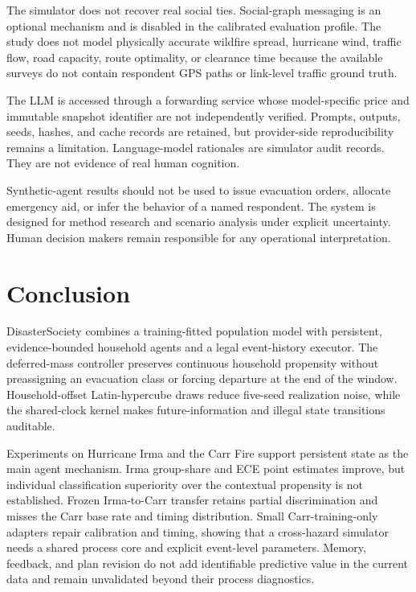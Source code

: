 \documentclass[journal]{IEEEtran}
\newcommand{\method}{DisasterSociety}
\begin{document}
The simulator does not recover real social ties. Social-graph messaging is an
optional mechanism and is disabled in the calibrated evaluation profile. The
study does not model physically accurate wildfire spread, hurricane wind,
traffic flow, road capacity, route optimality, or clearance time because the
available surveys do not contain respondent GPS paths or link-level traffic
ground truth.

The LLM is accessed through a forwarding service whose model-specific price
and immutable snapshot identifier are not independently verified. Prompts,
outputs, seeds, hashes, and cache records are retained, but provider-side
reproducibility remains a limitation. Language-model rationales are simulator
audit records. They are not evidence of real human cognition.

Synthetic-agent results should not be used to issue evacuation orders,
allocate emergency aid, or infer the behavior of a named respondent. The
system is designed for method research and scenario analysis under explicit
uncertainty. Human decision makers remain responsible for any operational
interpretation.

\section{Conclusion}
\method{} combines a training-fitted population model with persistent,
evidence-bounded household agents and a legal event-history executor. The
deferred-mass controller preserves continuous household propensity without
preassigning an evacuation class or forcing departure at the end of the
window. Household-offset Latin-hypercube draws reduce five-seed realization
noise, while the shared-clock kernel makes future-information and illegal
state transitions auditable.

Experiments on Hurricane Irma and the Carr Fire support persistent state as the
main agent mechanism. Irma group-share and ECE point estimates improve, but
individual classification superiority over the contextual propensity is not
established. Frozen Irma-to-Carr transfer retains partial discrimination and
misses the Carr base rate and timing distribution. Small Carr-training-only
adapters repair calibration and timing, showing that a cross-hazard simulator
needs a shared process core and explicit event-level parameters. Memory,
feedback, and plan revision do not add identifiable predictive value in the
current data and remain unvalidated beyond their process diagnostics.



\end{document}
